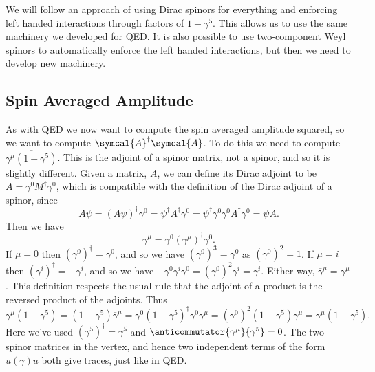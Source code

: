 \documentclass[fleqn]{NotesClass}
\newcommand{\diracadjoint}[1]{\overbar{#1}}
\newcommand{\hermit}{\dagger}
\newcommand{\amplitude}{\symcal{A}}
\begin{document}
    We will follow an approach of using Dirac spinors for everything and enforcing left handed interactions through factors of \(1 - \gamma^5\).
    This allows us to use the same machinery we developed for QED.
    It is also possible to use two-component Weyl spinors to automatically enforce the left handed interactions, but then we need to develop new machinery.
    
    \subsection{Spin Averaged Amplitude}
    As with QED we now want to compute the spin averaged amplitude squared, so we want to compute \(\amplitude^\hermit \amplitude\).
    To do this we need to compute \(\overline{\gamma^\mu(1 - \gamma^5)}\).
    This is the adjoint of a spinor matrix, not a spinor, and so it is slightly different.
    Given a matrix, \(A\), we can define its Dirac adjoint to be \(\diracadjoint{A} = \gamma^0M^\hermit\gamma^0\), which is compatible with the definition of the Dirac adjoint of a spinor, since
    \begin{equation}
        \overline{A \psi} = (A \psi)^\hermit \gamma^0 = \psi^\hermit A^\hermit \gamma^0 = \psi^\hermit \gamma^0 \gamma^0 A^\hermit \gamma^0 = \diracadjoint{\psi}\diracadjoint{A}.
    \end{equation}
    Then we have
    \begin{equation}
        \diracadjoint{\gamma}^\mu = \gamma^0 (\gamma^\mu)^\hermit \gamma^0.
    \end{equation}
    If \(\mu = 0\) then \((\gamma^0)^\hermit = \gamma^0\), and so we have \((\gamma^0)^3 = \gamma^0\) as \((\gamma^0)^2 = 1\).
    If \(\mu = i\) then \((\gamma^i)^\hermit = -\gamma^i\), and so we have \(-\gamma^0\gamma^i\gamma^0 = (\gamma^0)^2\gamma^i = \gamma^i\).
    Either way, \(\diracadjoint{\gamma}^\mu = \gamma^\mu\).
    This definition respects the usual rule that the adjoint of a product is the reversed product of the adjoints.
    Thus
    \begin{equation*}
        \overline{\gamma^\mu(1 - \gamma^5)} = \overline{(1 - \gamma^5)} \diracadjoint{\gamma}^\mu = \gamma^0(1 - \gamma^5)^\hermit \gamma^0 \gamma^\mu = (\gamma^0)^2 (1 + \gamma^5) \gamma^\mu = \gamma^\mu(1 - \gamma^5).
    \end{equation*}
    Here we've used \((\gamma^5)^\hermit = \gamma^5\) and \(\anticommutator{\gamma^\mu}{\gamma^5} = 0\).
    The two spinor matrices in the vertex, and hence two independent terms of the form \(\diracadjoint{u}(\gamma)u\) both give traces, just like in QED.
\end{document}
